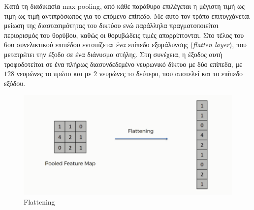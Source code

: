 \medskip
Κατά τη διαδικασία max pooling, από κάθε παράθυρο επιλέγεται η μέγιστη τιμή ως τιμη ως τιμή αντιπρόσωπος για το επόμενο επίπεδο. Με αυτό τον τρόπο επιτυγχάνεται μείωση της διαστασιμότητας του δικτύου ενώ παράλληλα πραγματοποιείται περιορισμός του θορύβου, καθώς οι θορυβώδεις τιμές απορρίπτονται. Στο τέλος του 6ου συνελικτικού επιπέδου εντοπίζεται ένα επίπεδο εξομάλυνσης (\textit{flatten layer}), που μετατρέπει την έξοδο σε ένα διάνυσμα στήλης. Στη συνέχεια, η έξοδος αυτή τροφοδοτείται σε ένα πλήρως διασυνδεδεμένο νευρωνικό δίκτυο με δύο επίπεδα, με $128$ νευρώνες το πρώτο και με $2$ νευρώνες το δεύτερο, που αποτελεί και το επίπεδο εξόδου.

\medskip
\begin{figure}[h]
  \centering
  \includegraphics[scale=0.8]{images/flatten.png}
  \caption{Flattening}
  \label{fig:flatten}
\end{figure}